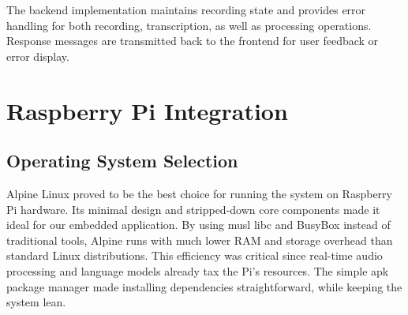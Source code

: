 The backend implementation maintains recording state and provides error handling for
both recording, transcription, as well as processing operations. Response messages are transmitted
back to the frontend for user feedback or error display.
\section{Raspberry Pi Integration}
\subsection{Operating System Selection}
Alpine Linux proved to be the best choice for running
the system on Raspberry Pi hardware. Its minimal design and
stripped-down core components made it ideal for our embedded
application. By using musl libc and BusyBox instead of traditional
tools, Alpine runs with much lower RAM and storage overhead
than standard Linux distributions. This efficiency was critical since
real-time audio processing and language models already tax the Pi's
resources. The simple apk package manager made installing dependencies straightforward,
while keeping the system lean.
